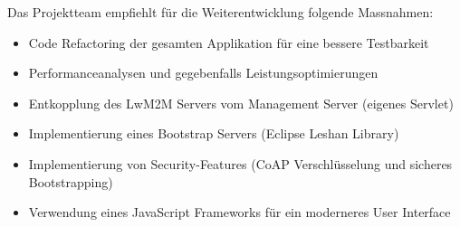Das Projektteam empfiehlt für die Weiterentwicklung folgende Massnahmen:
\begin{itemize}
\item Code Refactoring der gesamten Applikation für eine bessere Testbarkeit
\item Performanceanalysen und gegebenfalls Leistungsoptimierungen
\item Entkopplung des LwM2M Servers vom Management Server (eigenes Servlet)
\item Implementierung eines Bootstrap Servers (Eclipse Leshan Library)
\item Implementierung von Security-Features (CoAP Verschlüsselung und sicheres Bootstrapping)
\item Verwendung eines JavaScript Frameworks für ein moderneres User Interface
\end{itemize}